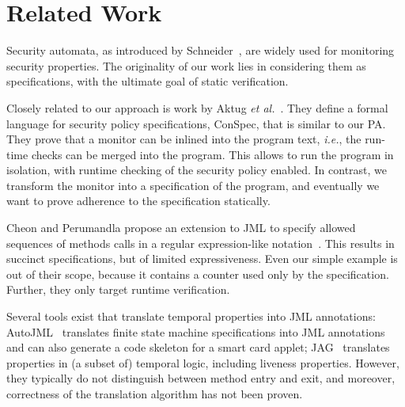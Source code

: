 \section{Related Work}\label{SecRelated}

Security automata, as introduced by Schneider~\cite{Schneider99}, are
widely used for monitoring security properties. The originality of our
work lies in considering them as specifications, with the ultimate
goal of static verification.

Closely related to our approach is work by Aktug \emph{et
al.}~\cite{Aktug07,AktugDG08}. They define a formal language for
security policy specifications, ConSpec, that is similar to our
PA. They prove that a monitor can be inlined into the program text,
\emph{i.e.}, the run-time checks can be merged into the program. This
allows to run the program in isolation, with runtime checking of the
security policy enabled. In contrast, we transform the monitor into a
specification of the program, and eventually we want to prove
adherence to the specification statically.

Cheon and Perumandla propose an extension to JML to specify allowed
sequences of methods calls in a regular expression-like
notation~\cite{Cheon07}.  This results in succinct specifications, but
of limited expressiveness. Even our simple example is out of their
scope, because it contains a counter used only by the
specification. Further, they only target runtime verification.

Several tools exist that translate temporal properties into JML
annotations: AutoJML~\cite{Hubbers03} translates finite state machine
specifications into JML annotations and can also generate a code
skeleton for a smart card applet; JAG~\cite{Giorgetti06} translates
properties in (a subset of) temporal logic, including liveness
properties.  However, they typically do not distinguish between method
entry and exit, and moreover, correctness of the translation algorithm
has not been proven.

